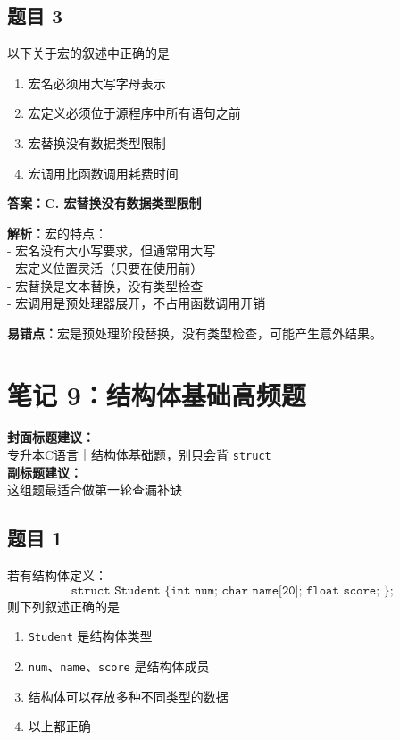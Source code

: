 \documentclass[12pt,a4paper]{ctexart}
\begin{document}
\subsection*{题目 3}
以下关于宏的叙述中正确的是
\begin{enumerate}[label=\Alph*.]
	\item 宏名必须用大写字母表示
	\item 宏定义必须位于源程序中所有语句之前
	\item 宏替换没有数据类型限制
	\item 宏调用比函数调用耗费时间
\end{enumerate}

\begin{answerbox}
	\textbf{答案：C. 宏替换没有数据类型限制}

	\textbf{解析：}宏的特点：\\
	- 宏名没有大小写要求，但通常用大写\\
	- 宏定义位置灵活（只要在使用前）\\
	- 宏替换是文本替换，没有类型检查\\
	- 宏调用是预处理器展开，不占用函数调用开销

	\textbf{易错点：}宏是预处理阶段替换，没有类型检查，可能产生意外结果。
\end{answerbox}

\newpage

\section{笔记 9：结构体基础高频题}
\begin{coverbox}
	\textbf{封面标题建议：}\\
	专升本C语言｜结构体基础题，别只会背 \texttt{struct}\\
	\textbf{副标题建议：}\\
	这组题最适合做第一轮查漏补缺
\end{coverbox}

\subsection*{题目 1}
若有结构体定义：
\[
	\texttt{struct Student \{ int num; char name[20]; float score; \};}
\]
则下列叙述正确的是
\begin{enumerate}[label=\Alph*.]
	\item \texttt{Student} 是结构体类型
	\item \texttt{num}、\texttt{name}、\texttt{score} 是结构体成员
	\item 结构体可以存放多种不同类型的数据
	\item 以上都正确
\end{enumerate}
\end{document}
